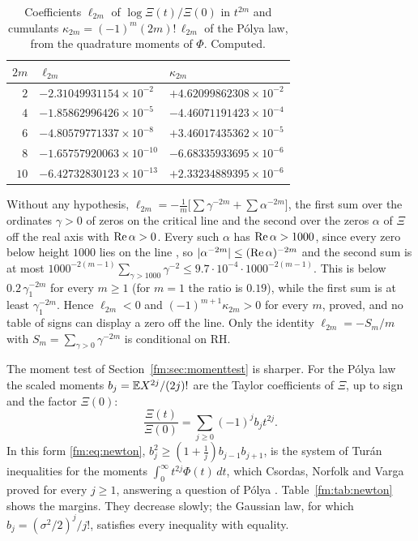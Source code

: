 \begin{table}[htbp]
\centering\small
\begin{tabular}{@{}rll@{}}
\toprule
$2m$ & $\ell_{2m}$ & $\kappa_{2m}$\\
\midrule
$2$ & $-2.31049931154\times10^{-2}$ & $+4.62099862308\times10^{-2}$\\
$4$ & $-1.85862996426\times10^{-5}$ & $-4.46071191423\times10^{-4}$\\
$6$ & $-4.80579771337\times10^{-8}$ & $+3.46017435362\times10^{-5}$\\
$8$ & $-1.65757920063\times10^{-10}$ & $-6.68335933695\times10^{-6}$\\
$10$ & $-6.42732830123\times10^{-13}$ & $+2.33234889395\times10^{-6}$\\
\bottomrule
\end{tabular}
\caption{Coefficients $\ell_{2m}$ of $\log\Xi(t)/\Xi(0)$ in $t^{2m}$ and cumulants $\kappa_{2m}=(-1)^m(2m)!\,\ell_{2m}$ of the P\'olya law, from the quadrature moments of $\Phi$. Computed.}
\label{xi:tab:cumext}
\end{table}

\begin{remark}\label{xi:rem:cumsign}
Without any hypothesis, $\ell_{2m}=-\frac1m\big[\sum\gamma^{-2m}+\sum\alpha^{-2m}\big]$, the first sum over the ordinates $\gamma>0$ of zeros on the critical line and the second over the zeros $\alpha$ of $\Xi$ off the real axis with $\operatorname{Re}\alpha>0$. Every such $\alpha$ has $\operatorname{Re}\alpha>1000$, since every zero below height $1000$ lies on the line \cite{PT21}, so $|\alpha^{-2m}|\le(\operatorname{Re}\alpha)^{-2m}$ and the second sum is at most $1000^{-2(m-1)}\sum_{\gamma>1000}\gamma^{-2}\le9.7\cdot10^{-4}\cdot1000^{-2(m-1)}$. This is below $0.2\,\gamma_1^{-2m}$ for every $m\ge1$ (for $m=1$ the ratio is $0.19$), while the first sum is at least $\gamma_1^{-2m}$. Hence $\ell_{2m}<0$ and $(-1)^{m+1}\kappa_{2m}>0$ for every $m$, proved, and no table of signs can display a zero off the line. Only the identity $\ell_{2m}=-S_m/m$ with $S_m=\sum_{\gamma>0}\gamma^{-2m}$ is conditional on RH.
\end{remark}

The moment test of Section~\ref{fm:sec:momenttest} is sharper. For the P\'olya law the scaled moments $b_j=\mathbb{E} X^{2j}/(2j)!$ are the Taylor coefficients of $\Xi$, up to sign and the factor $\Xi(0)$:
\[
\frac{\Xi(t)}{\Xi(0)}=\sum_{j\ge0}(-1)^jb_jt^{2j} .
\]
In this form \eqref{fm:eq:newton}, $b_j^2\ge(1+\frac1j)b_{j-1}b_{j+1}$, is the system of Tur\'an inequalities for the moments $\int_0^\infty t^{2j}\Phi(t)\,dt$, which Csordas, Norfolk and Varga proved for every $j\ge1$, answering a question of P\'olya \cite{CNV86}. Table~\ref{fm:tab:newton} shows the margins. They decrease slowly; the Gaussian law, for which $b_j=(\sigma^2/2)^j/j!$, satisfies every inequality with equality.

